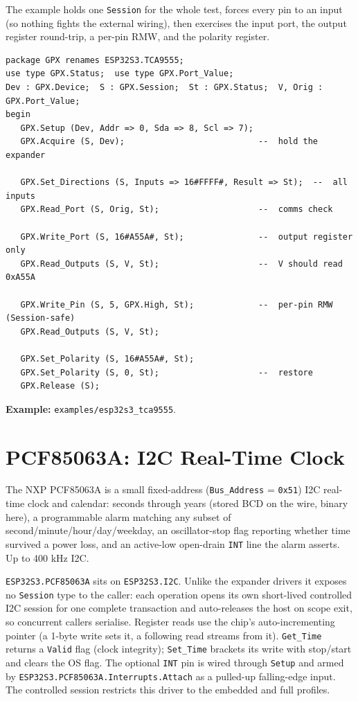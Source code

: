 The example holds one \texttt{Session} for the whole test, forces every pin to an
input (so nothing fights the external wiring), then exercises the input port, the
output register round-trip, a per-pin RMW, and the polarity register.

\begin{lstlisting}
package GPX renames ESP32S3.TCA9555;
use type GPX.Status;  use type GPX.Port_Value;
Dev : GPX.Device;  S : GPX.Session;  St : GPX.Status;  V, Orig : GPX.Port_Value;
begin
   GPX.Setup (Dev, Addr => 0, Sda => 8, Scl => 7);
   GPX.Acquire (S, Dev);                           --  hold the expander

   GPX.Set_Directions (S, Inputs => 16#FFFF#, Result => St);  --  all inputs
   GPX.Read_Port (S, Orig, St);                    --  comms check

   GPX.Write_Port (S, 16#A55A#, St);               --  output register only
   GPX.Read_Outputs (S, V, St);                    --  V should read 0xA55A

   GPX.Write_Pin (S, 5, GPX.High, St);             --  per-pin RMW (Session-safe)
   GPX.Read_Outputs (S, V, St);

   GPX.Set_Polarity (S, 16#A55A#, St);
   GPX.Set_Polarity (S, 0, St);                    --  restore
   GPX.Release (S);
\end{lstlisting}

\noindent\textbf{Example:} \texttt{examples/esp32s3\_tca9555}.

\section{PCF85063A: I2C Real-Time Clock}
\label{app:ext:pcf85063a}

The NXP PCF85063A is a small fixed-address (\texttt{Bus\_Address} = \texttt{0x51})
I2C real-time clock and calendar: seconds through years (stored BCD on the wire,
binary here), a programmable alarm matching any subset of
second/minute/hour/day/weekday, an oscillator-stop flag reporting whether time
survived a power loss, and an active-low open-drain \texttt{INT} line the alarm
asserts. Up to 400 kHz I2C.

\texttt{ESP32S3.PCF85063A} sits on \texttt{ESP32S3.I2C}. Unlike the expander
drivers it exposes no \texttt{Session} type to the caller: each operation opens
its own short-lived controlled I2C session for one complete transaction and
auto-releases the host on scope exit, so concurrent callers serialise. Register
reads use the chip's auto-incrementing pointer (a 1-byte write sets it, a following
read streams from it). \texttt{Get\_Time} returns a \texttt{Valid} flag (clock
integrity); \texttt{Set\_Time} brackets its write with stop/start and clears the OS
flag. The optional \texttt{INT} pin is wired through \texttt{Setup} and armed by
\texttt{ESP32S3.PCF85063A.Interrupts.Attach} as a pulled-up falling-edge input. The
controlled session restricts this driver to the embedded and full profiles.

